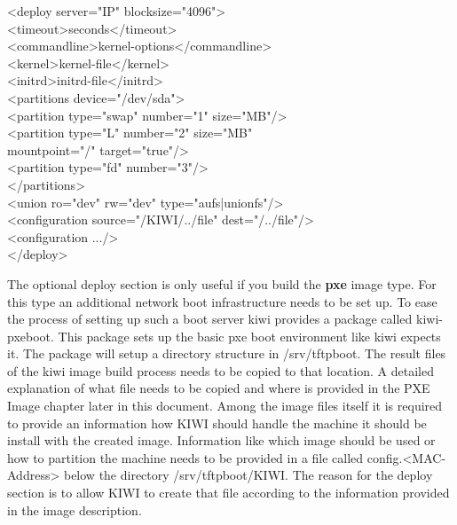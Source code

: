 \begin{Command}{14cm}
<deploy server="IP" blocksize="4096">\\
\hspace*{1cm}<timeout>seconds</timeout>\\
\hspace*{1cm}<commandline>kernel-options</commandline>\\
\hspace*{1cm}<kernel>kernel-file</kernel>\\
\hspace*{1cm}<initrd>initrd-file</initrd>\\
\hspace*{1cm}<partitions device="/dev/sda">\\
\hspace*{2cm}<partition type="swap" number="1" size="MB"/>\\
\hspace*{2cm}<partition type="L" number="2" size="MB"\\
\hspace*{4.5cm}mountpoint="/" target="true"/>\\
\hspace*{2cm}<partition type="fd" number="3"/>\\
\hspace*{1cm}</partitions>\\
\hspace*{1cm}<union ro="dev" rw="dev" type="aufs|unionfs"/>\\
\hspace*{1cm}<configuration source="/KIWI/../file" dest="/../file"/>\\
\hspace*{1cm}<configuration .../>\\
</deploy>
\end{Command}

The optional deploy section is only useful if you build the \textbf{pxe}
image type. For this type an additional network boot infrastructure needs
to be set up. To ease the process of setting up such a boot server kiwi
provides a package called kiwi-pxeboot. This package sets up the basic
pxe boot environment like kiwi expects it. The package will setup a
directory structure in /srv/tftpboot. The result files of the kiwi
image build process needs to be copied to that location. A detailed
explanation of what file needs to be copied and where is provided in
the PXE Image chapter later in this document. Among the image files itself
it is required to provide an information how KIWI should handle the
machine it should be install with the created image. Information like
which image should be used or how to partition the machine needs to
be provided in a file called config.<MAC-Address> below the directory
/srv/tftpboot/KIWI. The reason for the deploy section is to allow KIWI
to create that file according to the information provided in the image
description.

